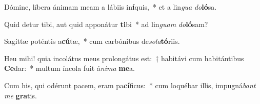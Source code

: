 \item Dómine, líbera ánimam meam a lábiis in\textbf{í}quis,~* et a lin\textit{gua} \textit{do}\textbf{ló}sa.
\item Quid detur tibi, aut quid apponátur \textbf{ti}bi~* ad lin\textit{guam} \textit{do}\textbf{ló}sam?
\item Sagíttæ poténtis a\textbf{cú}tæ,~* cum carbónibus de\textit{so}\textit{la}\textbf{tó}riis.
\item Heu mihi! quia incolátus meus prolongátus est:~† habitávi cum habitántibus \textbf{Ce}dar:~* multum íncola fuit á\textit{ni}\textit{ma} \textbf{me}a.
\item Cum his, qui odérunt pacem, eram pa\textbf{cí}ficus:~* cum loquébar illis, impugná\textit{bant} \textit{me} \textbf{gra}tis.
